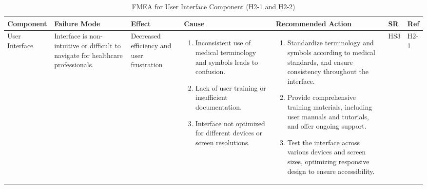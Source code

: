 \documentclass{article}
\begin{document}
\begin{landscape}
    \begin{table}[ht]
    \centering
    \caption{FMEA for User Interface Component (H2-1 and H2-2)}
    \renewcommand{\arraystretch}{1.1}
    {
    \setlength{\tabcolsep}{2pt}
    \begin{tabular}{|p{2.5cm}|p{2.5cm}|p{3cm}|p{5cm}|p{6cm}|p{1cm}|p{1cm}|}
    \hline
    \textbf{Component} & \textbf{Failure Mode} & \textbf{Effect} & \textbf{Cause} & \textbf{Recommended Action} & \textbf{SR} & \textbf{Ref} \\
    \hline

    User Interface
     & Interface is non-intuitive or difficult to navigate for healthcare professionals.
     & Decreased efficiency and user frustration
     &
     \begin{enumerate}[leftmargin=*, label={\alph*.}, itemsep=1pt]
         \item Inconsistent use of medical terminology and symbols leads to confusion.
         \item Lack of user training or insufficient documentation.
         \item Interface not optimized for different devices or screen resolutions.
     \end{enumerate}
     &
     \begin{enumerate}[leftmargin=*, label={\alph*.}, itemsep=1pt]
         \item Standardize terminology and symbols according to medical standards, and ensure consistency throughout the interface.
         \item Provide comprehensive training materials, including user manuals and tutorials, and offer ongoing support.
         \item Test the interface across various devices and screen sizes, optimizing responsive design to ensure accessibility.
     \end{enumerate}
     & HS3 & H2-1 \\ \hline


\end{tabular}}
\end{table}
\end{landscape}
\end{document}
